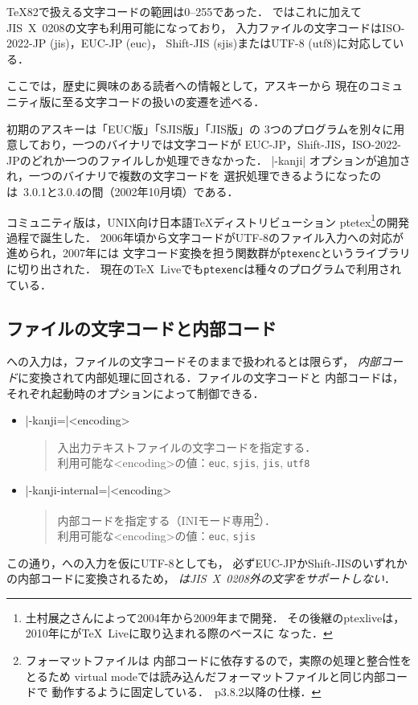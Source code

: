 \documentclass[a4paper,11pt,nomag,dvipdfmx]{jsarticle}
\def\code#1{\texttt{#1}}
\begin{document}
\TeX82で扱える文字コードの範囲は0--255であった．
\pTeX ではこれに加えてJIS~X~0208の文字も利用可能になっており，
入力ファイルの文字コードはISO-2022-JP (jis)，EUC-JP (euc)，
Shift-JIS (sjis)またはUTF-8 (utf8)に対応している．

\begin{dangerous}
ここでは，歴史に興味のある読者への情報として，アスキー\pTeX から
現在のコミュニティ版\pTeX に至る文字コードの扱いの変遷を述べる．

初期のアスキー\pTeX は「EUC版\pTeX 」「SJIS版\pTeX 」「JIS版\pTeX 」の
3つのプログラムを別々に用意しており，一つの\pTeX バイナリでは文字コードが
EUC-JP，Shift-JIS，ISO-2022-JPのどれか一つのファイルしか処理できなかった．
|-kanji| オプションが追加され，一つの\pTeX バイナリで複数の文字コードを
選択処理できるようになったのは\pTeX~3.0.1と3.0.4の間（2002年10月頃）である．

コミュニティ版\pTeX は，UNIX向け日本語\TeX ディストリビューション
ptetex\footnote{土村展之さんによって2004年から2009年まで開発．
その後継のptexliveは，2010年に\pTeX が\TeX~Liveに取り込まれる際のベースに
なった．}の開発過程で誕生した．
2006年頃から文字コードがUTF-8のファイル入力への対応が進められ，2007年には
文字コード変換を担う関数群が\code{ptexenc}というライブラリに切り出された．
現在の\TeX~Liveでも\code{ptexenc}は種々のプログラムで利用されている．
\end{dangerous}

\subsection{ファイルの文字コードと内部コード}
\pTeX への入力は，ファイルの文字コードそのままで扱われるとは限らず，
\emph{内部コード}に変換されて内部処理に回される．ファイルの文字コードと
内部コードは，それぞれ起動時のオプションによって制御できる．
\begin{itemize}
 \item |-kanji=|<encoding>
  \begin{quotation}
   入出力テキストファイルの文字コードを指定する．\\
   利用可能な<encoding>の値：\code{euc}, \code{sjis}, \code{jis}, \code{utf8}
  \end{quotation}
 \item |-kanji-internal=|<encoding>
  \begin{quotation}
   内部コードを指定する（INIモード専用\footnote{フォーマットファイルは
   内部コードに依存するので，実際の処理と整合性をとるため
   virtual modeでは読み込んだフォーマットファイルと同じ内部コードで
   動作するように固定している．\pTeX\ p3.8.2以降の仕様．}）．\\
   利用可能な<encoding>の値：\code{euc}, \code{sjis}
  \end{quotation}
\end{itemize}
この通り，\pTeX への入力を仮にUTF-8としても，
必ずEUC-JPかShift-JISのいずれかの内部コードに変換されるため，
\emph{\pTeX はJIS~X~0208外の文字をサポートしない}．
\end{document}
